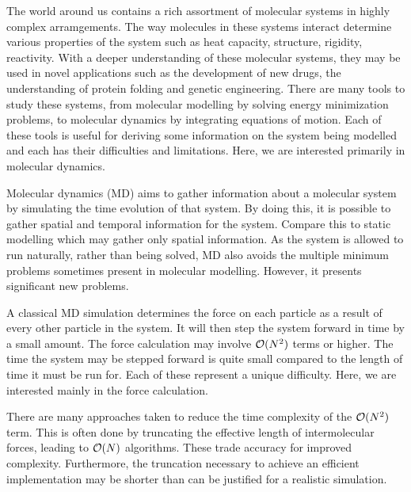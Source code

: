 %
%

%
The world around us contains
a rich assortment of molecular systems in
highly complex arramgements.
%
The way molecules in these systems interact determine various properties
of the system such as heat capacity, structure, rigidity, reactivity.
%
With a deeper understanding of these molecular systems,
they may be used in novel applications such as
the development of new drugs,
the understanding of protein folding and
genetic engineering.
%
There are many tools to study these systems,
from molecular modelling by solving energy minimization problems,
to molecular dynamics by integrating equations of motion.
%
Each of these tools is useful for
deriving some information on the system being modelled and
each has their difficulties and limitations.
%
Here, we are interested primarily in molecular dynamics.

Molecular dynamics (MD) aims to
gather information about a molecular system by
simulating the time evolution of that system.
%
By doing this, it is possible to
gather spatial and temporal information for the system.
%
Compare this to static modelling which may gather only spatial information.
%
As the system is allowed to run naturally, rather than being solved,
MD also avoids the multiple minimum problems
sometimes present in molecular modelling.
%
However, it presents significant new problems.


%
A classical MD simulation determines
the force on each particle as a result of
every other particle in the system.
%
It will then step the system forward in time by a small amount.
%
The force calculation may involve $\mathcal{O}{(N^2)}$ terms or higher.
%
The time the system may be stepped forward is
quite small compared to the length of time it must be run for.
%
Each of these represent a unique difficulty.
%
Here, we are interested mainly in the force calculation.


There are many approaches taken to reduce the time complexity of
the $\mathcal{O}{(N^2)}$ term.
%
This is often done by truncating the effective length of intermolecular
forces, leading to $\mathcal{O}{(N)}$ algorithms.
%
These trade accuracy for improved complexity.
%
Furthermore, the truncation necessary to achieve an efficient implementation
may be shorter than can be justified for a realistic simulation.

